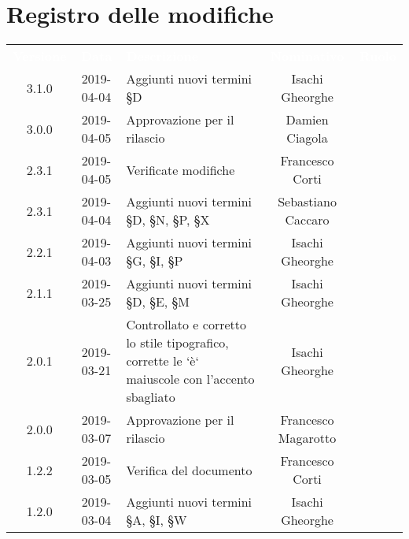 
\section*{Registro delle modifiche}
{
	\renewcommand{\arraystretch}{1.5}
	\centering
	\begin{longtable}{ c c  C{4cm}  c  c }
		
		\textcolor{white}{\textbf{Versione}} & \textcolor{white}{\textbf{Data}} & \textcolor{white}{\textbf{Descrizione}} & \textcolor{white}{\textbf{Nominativo}} & \textcolor{white}{\textbf{Ruolo}}\\
		
		3.1.0 & 2019-04-04 & Aggiunti nuovi termini \S{D} & Isachi Gheorghe &\reda{}\\		
		
		3.0.0 & 2019-04-05 & Approvazione per il rilascio & Damien Ciagola &\Res{}\\

		2.3.1 & 2019-04-05 & Verificate modifiche & Francesco Corti &\ver{}\\

		2.3.1 & 2019-04-04 & Aggiunti nuovi termini \S{D}, \S{N}, \S{P}, \S{X} & Sebastiano Caccaro &\reda{}\\

		2.2.1 & 2019-04-03 & Aggiunti nuovi termini \S{G}, \S{I}, \S{P} & Isachi Gheorghe &\reda{}\\

		2.1.1 & 2019-03-25 & Aggiunti nuovi termini \S{D}, \S{E}, \S{M} & Isachi Gheorghe &\reda{}\\

		2.0.1 & 2019-03-21 & Controllato e corretto lo stile tipografico, corrette le `è` maiuscole con l'accento sbagliato &  Isachi Gheorghe & \reda{}\\			
		
		2.0.0 & 2019-03-07 & Approvazione per il rilascio &  Francesco Magarotto & \Res{}\\	

		1.2.2 & 2019-03-05 & Verifica del documento &  Francesco Corti & \ver{}\\		
		
		1.2.0 & 2019-03-04 & Aggiunti nuovi termini \S{A}, \S{I}, \S{W} & Isachi Gheorghe &\reda{}\\
		

\end{longtable}}
